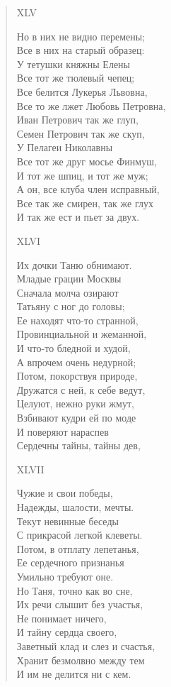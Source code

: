 \begin{verse}
XLV

Но в них не видно перемены;\\
Все в них на старый образец:\\
У тетушки княжны Елены\\
Все тот же тюлевый чепец;\\
Все белится Лукерья Львовна,\\
Все то же лжет Любовь Петровна,\\
Иван Петрович так же глуп,\\
Семен Петрович так же скуп,\\
У Пелагеи Николавны\\
Все тот же друг мосье Финмуш,\\
И тот же шпиц, и тот же муж;\\
А он, все клуба член исправный,\\
Все так же смирен, так же глух\\
И так же ест и пьет за двух.

XLVI

Их дочки Таню обнимают.\\
Младые грации Москвы\\
Сначала молча озирают\\
Татьяну с ног до головы;\\
Ее находят что-то странной,\\
Провинциальной и жеманной,\\
И что-то бледной и худой,\\
А впрочем очень недурной;\\
Потом, покорствуя природе,\\
Дружатся с ней, к себе ведут,\\
Целуют, нежно руки жмут,\\
Взбивают кудри ей по моде\\
И поверяют нараспев\\
Сердечны тайны, тайны дев,

XLVII

Чужие и свои победы,\\
Надежды, шалости, мечты.\\
Текут невинные беседы\\
С прикрасой легкой клеветы.\\
Потом, в отплату лепетанья,\\
Ее сердечного признанья\\
Умильно требуют оне.\\
Но Таня, точно как во сне,\\
Их речи слышит без участья,\\
Не понимает ничего,\\
И тайну сердца своего,\\
Заветный клад и слез и счастья,\\
Хранит безмолвно между тем\\
И им не делится ни с кем.


\end{verse}
